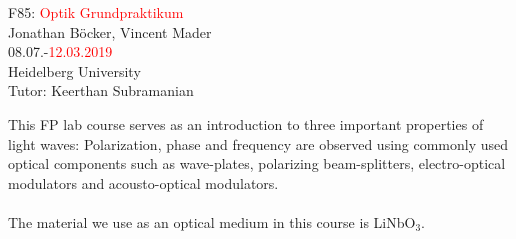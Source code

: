 
\begin{center}
    \null\vspace{15mm}
    \Huge 
    F85: \textcolor{red}{Optik Grundpraktikum} \\
    \vspace{10mm}
    \Large
    Jonathan B\"ocker, Vincent Mader \\
    \vspace{10mm}
    08.07.-\textcolor{red}{12.03.2019} \\
    Heidelberg University \\
    Tutor: Keerthan Subramanian \\
    \vspace{35mm}
\end{center}

\noindent
{}
This FP lab course serves as an introduction to three important properties of
light waves: Polarization, phase and frequency are observed
using commonly used optical components such as wave-plates, polarizing
beam-splitters, electro-optical modulators and acousto-optical modulators. \\
\\ The material we use as an optical medium in this course is LiNbO$_3$.

